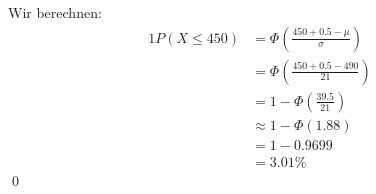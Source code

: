 \documentclass{abgabe}
\begin{document}
\begin{questions}
\begin{parts}
\begin{solution}
            Wir berechnen: 
            \begin{alignat*}{1}
                P(X \leq 450) & = \Phi\left( \frac{450 + 0.5 -\mu}{\sigma} \right) \\
                              & = \Phi\left( \frac{450 + 0.5 -490}{21} \right)     \\
                              & = 1 - \Phi\left( \frac{39.5}{21} \right)           \\
                              & \approx 1 - \Phi(1.88)                             \\
                              & = 1 - 0.9699                                       \\
                              & = 3.01\%
            \end{alignat*}
            \qed
        \end{solution}
    \end{parts}
\end{questions}
\end{document}
